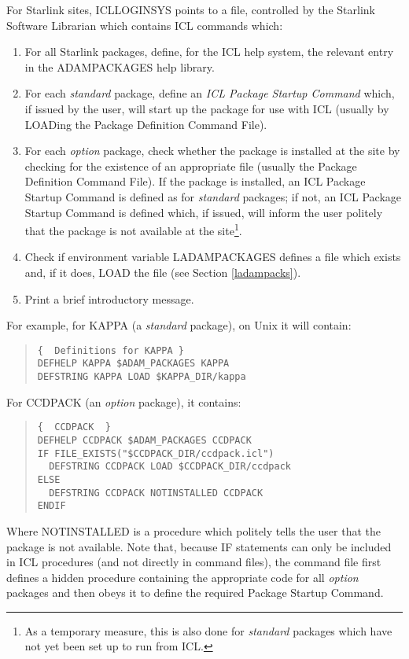 \documentclass[twoside,11pt]{article}
\newcommand{\xref}[3]{#1}
\renewcommand{\_}{\texttt{\symbol{95}}}
\begin{document}
For Starlink sites, ICL\_LOGIN\_SYS points to a file, controlled by the
Starlink Software Librarian which contains ICL commands which:
\begin{enumerate}
\item For all Starlink packages, define, for the ICL
help system, the relevant entry in the ADAM\-\_PACKAGES help library.
\item For each \textit{standard}\/ package, define an
\textit{ICL Package Startup Command} which, if issued by the user, will
start up the package for use with ICL (usually by
\xref{LOAD}{sg5}{LOAD}ing the Package Definition
Command File).
\item For each \textit{option}\/ package, check whether the package is installed
at the site by checking for the existence of an appropriate file (usually the
Package Definition Command File).
If the package is installed, an ICL Package Startup Command is defined as for
\textit{standard} packages; if not, an ICL Package Startup Command is defined
which, if issued, will inform the user politely that the package is not
available at the site\footnote{As a temporary measure, this is also done for
\textit{standard} packages which have not yet been set up to run from ICL.}.
\item Check if environment variable LADAM\-\_PACKAGES defines a file which
exists and, if it does,
\xref{LOAD}{sg5}{LOAD} the file (see  Section \ref{ladampacks}).
\item Print a brief introductory message.
\end{enumerate}

For example, for KAPPA (a \textit{standard} package), on Unix it will contain:
\begin{quote}
\begin{verbatim}
{  Definitions for KAPPA }
DEFHELP KAPPA $ADAM_PACKAGES KAPPA
DEFSTRING KAPPA LOAD $KAPPA_DIR/kappa
\end{verbatim}
\end{quote}

For CCDPACK (an \textit{option} package), it contains:
\begin{quote}
\begin{verbatim}
{  CCDPACK  }
DEFHELP CCDPACK $ADAM_PACKAGES CCDPACK
IF FILE_EXISTS("$CCDPACK_DIR/ccdpack.icl")
  DEFSTRING CCDPACK LOAD $CCDPACK_DIR/ccdpack
ELSE
  DEFSTRING CCDPACK NOTINSTALLED CCDPACK
ENDIF
\end{verbatim}
\end{quote}
Where NOTINSTALLED is a procedure which politely tells the user that the
package is not available.
Note that, because IF statements can only be included in ICL procedures (and not
directly in command files), the command file first defines a hidden procedure
containing the appropriate code for all \textit{option} packages and then obeys
it to define the required Package Startup Command.
\end{document}
